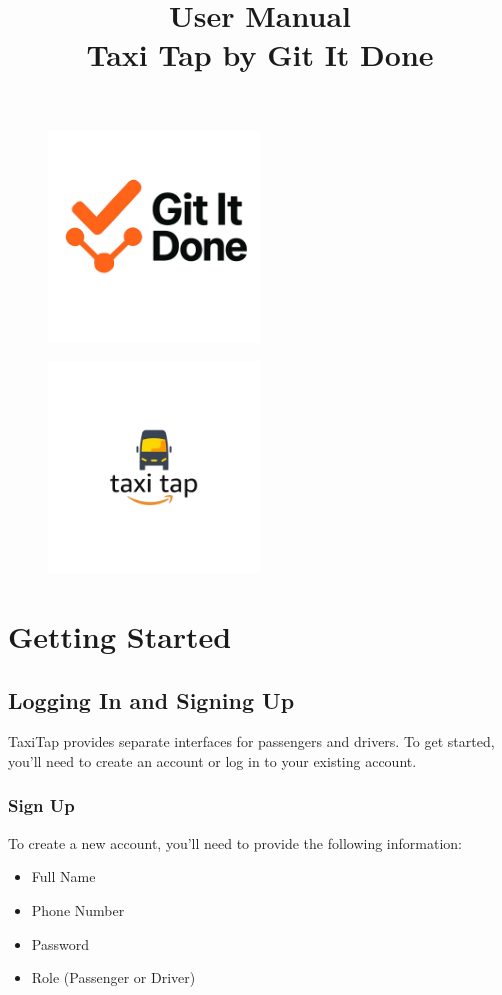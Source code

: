 \documentclass[12pt]{article}
\title{User Manual\\Taxi Tap by Git It Done}
\date{}
\begin{document}
\maketitle
\begin{figure}[H]
  \centering
  \includegraphics[width=0.5\textwidth]{LogoGroup.png} 
\end{figure}
\begin{figure}[H]
  \centering
  \includegraphics[width=0.5\textwidth]{LogoTaxiTap.png} 
\end{figure}
\newpage
\tableofcontents
\newpage

\section{Getting Started}

\subsection{Logging In and Signing Up}

TaxiTap provides separate interfaces for passengers and drivers. To get started, you'll need to create an account or log in to your existing account.

\subsubsection{Sign Up}
To create a new account, you'll need to provide the following information:
\begin{itemize}
    \item Full Name
    \item Phone Number
    \item Password
    \item Role (Passenger or Driver)
\end{itemize}
\end{document}
